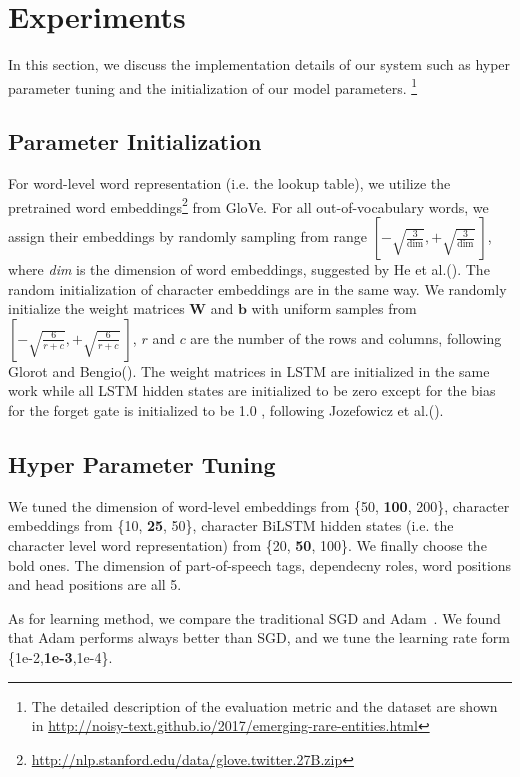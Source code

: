 \section{Experiments}
\label{sec:eval}
In this section, we discuss the implementation details of our system such as hyper parameter tuning and the initialization of our model parameters. 
\footnote{The detailed description of the evaluation metric and the dataset are shown in \url{http://noisy-text.github.io/2017/emerging-rare-entities.html}}
\subsection{Parameter Initialization}
For word-level word representation (i.e. the lookup table), 
we utilize the pretrained word embeddings\footnote{\url{http://nlp.stanford.edu/data/glove.twitter.27B.zip}} from GloVe\cite{Pennington2014GloveGV}.
For all out-of-vocabulary words, we assign their embeddings by randomly sampling from range $\left[-\sqrt{\frac{3}{\text{dim}}}, +\sqrt{\frac{3}{\text{dim}}}~\right]$, where \textit{dim} is the dimension of word embeddings, suggested by He et al.(\citeyear{DBLP:conf/iccv/HeZRS15}). The random initialization of character embeddings are in the same way.
We randomly initialize the weight matrices $\mathbf{W}$ and $\mathbf{b}$ with uniform samples from 
$\left[-\sqrt{\frac{6}{r+c}}, +\sqrt{\frac{6}{r+c}}~\right]$, 
$r$ and $c$ are the number of the rows and columns, following Glorot and Bengio(\citeyear{DBLP:journals/jmlr/GlorotB10}). 
The weight matrices in LSTM are initialized in the same work while  all LSTM hidden states are initialized to be zero except for the bias for the forget gate is initialized to be 1.0 , following Jozefowicz et al.(\citeyear{DBLP:conf/icml/JozefowiczZS15}).


\subsection{Hyper Parameter Tuning}
We tuned the dimension of word-level embeddings from \{50, \textbf{100}, 200\}, character embeddings from \{10, \textbf{25}, 50\}, character BiLSTM hidden states (i.e. the character level word representation)  from  \{20, \textbf{50}, 100\}. 
We finally choose the bold ones.
The dimension of part-of-speech tags, dependecny roles, word positions and head positions are all 5.

As for learning method, we compare the traditional SGD and Adam~\cite{kingma2014adam}.
We found that Adam performs always better than SGD, and we tune the learning rate form \{1e-2,\textbf{1e-3},1e-4\}.

